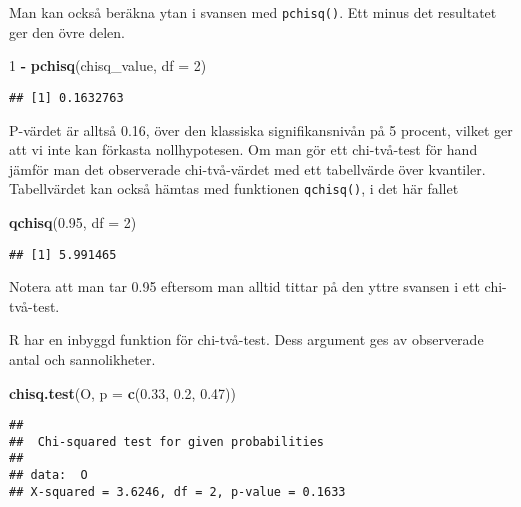 \documentclass[
]{book}
\newenvironment{Shaded}{\begin{snugshade}}{\end{snugshade}}
\newcommand{\AttributeTok}[1]{\textcolor[rgb]{0.13,0.29,0.53}{#1}}
\newcommand{\DecValTok}[1]{\textcolor[rgb]{0.00,0.00,0.81}{#1}}
\newcommand{\FloatTok}[1]{\textcolor[rgb]{0.00,0.00,0.81}{#1}}
\newcommand{\FunctionTok}[1]{\textcolor[rgb]{0.13,0.29,0.53}{\textbf{#1}}}
\newcommand{\NormalTok}[1]{#1}
\newcommand{\SpecialCharTok}[1]{\textcolor[rgb]{0.81,0.36,0.00}{\textbf{#1}}}
\theoremstyle{definition}
\theoremstyle{definition}
\theoremstyle{definition}
\theoremstyle{definition}
\theoremstyle{remark}
\begin{document}
Man kan också beräkna ytan i svansen med \texttt{pchisq()}. Ett minus det resultatet ger den övre delen.

\begin{Shaded}
\begin{Highlighting}[]
\DecValTok{1} \SpecialCharTok{{-}} \FunctionTok{pchisq}\NormalTok{(chisq\_value, }\AttributeTok{df =} \DecValTok{2}\NormalTok{)}
\end{Highlighting}
\end{Shaded}

\begin{verbatim}
## [1] 0.1632763
\end{verbatim}

P-värdet är alltså 0.16, över den klassiska signifikansnivån på 5 procent, vilket ger att vi inte kan förkasta nollhypotesen. Om man gör ett chi-två-test för hand jämför man det observerade chi-två-värdet med ett tabellvärde över kvantiler. Tabellvärdet kan också hämtas med funktionen \texttt{qchisq()}, i det här fallet

\begin{Shaded}
\begin{Highlighting}[]
\FunctionTok{qchisq}\NormalTok{(}\FloatTok{0.95}\NormalTok{, }\AttributeTok{df =} \DecValTok{2}\NormalTok{)}
\end{Highlighting}
\end{Shaded}

\begin{verbatim}
## [1] 5.991465
\end{verbatim}

Notera att man tar 0.95 eftersom man alltid tittar på den yttre svansen i ett chi-två-test.

R har en inbyggd funktion för chi-två-test. Dess argument ges av observerade antal och sannolikheter.

\begin{Shaded}
\begin{Highlighting}[]
\FunctionTok{chisq.test}\NormalTok{(O, }\AttributeTok{p =} \FunctionTok{c}\NormalTok{(}\FloatTok{0.33}\NormalTok{, }\FloatTok{0.2}\NormalTok{, }\FloatTok{0.47}\NormalTok{))}
\end{Highlighting}
\end{Shaded}

\begin{verbatim}
## 
##  Chi-squared test for given probabilities
## 
## data:  O
## X-squared = 3.6246, df = 2, p-value = 0.1633
\end{verbatim}
\end{document}
